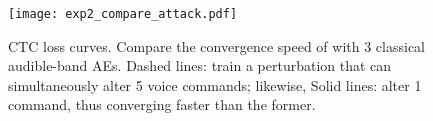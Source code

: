 \begin{figure}[t]
  \centering
  \begin{minipage}[b]{0.235\textwidth}
    \centering
    \hspace{-0.1\linewidth}
    \texttt{[image: exp2\_compare\_attack.pdf]}
  \end{minipage}
  \hfill
  \begin{minipage}[b]{0.235\textwidth}
    \centering
    \footnotesize
    \renewcommand\arraystretch{0.7}
    \renewcommand\tabcolsep{2.pt}
    \hspace{-0.1\linewidth}
    \vspace{-10pt}
  \end{minipage}
  \normalsize
  \caption{CTC loss curves. Compare the convergence speed of \alias with 3 classical audible-band AEs. Dashed lines: train a perturbation that can simultaneously alter 5 voice commands; likewise, Solid lines: alter 1 command, thus converging faster than the former.}
  \label{fig:dig_exp2}
  \vspace{-12pt}  
\end{figure}


